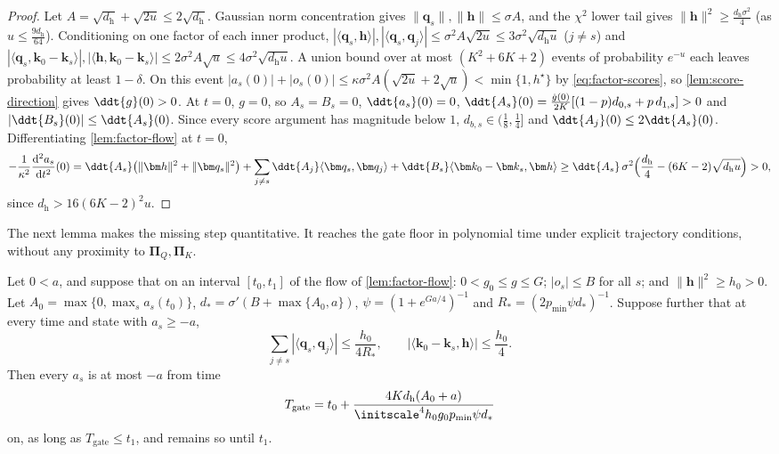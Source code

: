 \begin{proof}
Let $A=\sqrt{d_{\mathrm h}}+\sqrt{2u}\le2\sqrt{d_{\mathrm h}}$. Gaussian norm concentration gives $\|\bm q_s\|,\|\bm h\|\le\sigma A$, and the $\chi^2$ lower
tail gives $\|\bm h\|^2\ge\frac{d_{\mathrm h}\sigma^2}4$ (as $u\le\frac{9d_{\mathrm h}}{64}$). Conditioning on one factor of each inner product,
$|\langle\bm q_s,\bm h\rangle|,|\langle\bm q_s,\bm q_j\rangle|\le\sigma^2A\sqrt{2u}\le3\sigma^2\sqrt{d_{\mathrm h}u}$ ($j\ne s$) and
$|\langle\bm q_s,\bm k_0-\bm k_s\rangle|,|\langle\bm h,\bm k_0-\bm k_s\rangle|\le2\sigma^2A\sqrt u\le4\sigma^2\sqrt{d_{\mathrm h}u}$. A union bound
over at most $(K^2+6K+2)$ events of probability $e^{-u}$ each leaves probability at least $1-\delta$. On this event
$|a_s(0)|+|o_s(0)|\le\kappa\sigma^2A(\sqrt{2u}+2\sqrt u)<\min\{1,h^\star\}$ by \cref{eq:factor-scores}, so \cref{lem:score-direction} gives $\ddt{g}(0)>0$. At $t=0$, $g=0$, so $A_s=B_s=0$,
$\ddt{a_s}(0)=0$, $\ddt{A_s}(0)=\frac{\dot g(0)}{2K}[(1-p)d_{0,s}+p\,d_{1,s}]>0$ and $|\ddt{B_s}(0)|\le\ddt{A_s}(0)$. Since every score argument
has magnitude below $1$, $d_{b,s}\in(\frac18,\frac14]$ and $\ddt{A_j}(0)\le2\ddt{A_s}(0)$. Differentiating \cref{lem:factor-flow} at $t=0$,
\[
 -\frac{1}{\kappa^2}\frac{\mathrm d^2a_s}{\mathrm dt^2}(0)=\ddt{A_s}\bigl(\|\bm h\|^2+\|\bm q_s\|^2\bigr)+\sum_{j\ne s}\ddt{A_j}\langle\bm q_s,\bm q_j\rangle
 +\ddt{B_s}\langle\bm k_0-\bm k_s,\bm h\rangle
 \ge\ddt{A_s}\,\sigma^2\Bigl(\frac{d_{\mathrm h}}4-(6K-2)\sqrt{d_{\mathrm h}u}\Bigr)>0,
\]
since $d_{\mathrm h}>16(6K-2)^2u$.
\end{proof}

The next lemma makes the missing step quantitative. It reaches the gate floor in polynomial time under explicit trajectory conditions,
without any proximity to $\bm\Pi_Q,\bm\Pi_K$.

\begin{lemma}
\label{lem:gate-hitting}
Let $0<a$, and suppose that on an interval $[t_0,t_1]$ of the flow of \cref{lem:factor-flow}: $0<g_0\le g\le G$; $|o_s|\le B$ for all $s$;
and $\|\bm h\|^2\ge h_0>0$. Let $A_0=\max\{0,\max_sa_s(t_0)\}$, $d_\ast=\sigma'(B+\max\{A_0,a\})$, $\psi=(1+e^{Ga/4})^{-1}$ and
$R_\ast=(2p_{\min}\psi d_\ast)^{-1}$. Suppose further that at every time and state with $a_s\ge-a$,
\[
 \sum_{j\ne s}|\langle\bm q_s,\bm q_j\rangle|\le\frac{h_0}{4R_\ast},\qquad |\langle\bm k_0-\bm k_s,\bm h\rangle|\le\frac{h_0}4 .
\]
Then every $a_s$ is at most $-a$ from time
\[
 T_{\mathrm{gate}}=t_0+\frac{4Kd_{\mathrm h}(A_0+a)}{\initscale^4h_0g_0p_{\min}\psi d_\ast}
\]
on, as long as $T_{\mathrm{gate}}\le t_1$, and remains so until $t_1$.
\end{lemma}

